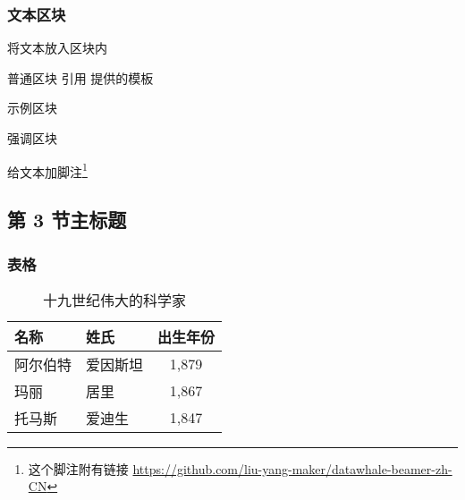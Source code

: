 \documentclass[10pt,utf8]{beamer}
\begin{document}
\begin{frame}[t]
  \frametitle{文本区块}
  将文本放入区块内
  \begin{block}{普通区块}
    引用 \autocite{Y.Liu2021datawhalebeamer} 提供的模板
  \end{block}
  \begin{exampleblock}{示例区块}
  \end{exampleblock}
  \begin{alertblock}{强调区块}
  \end{alertblock}
  给文本加脚注\footnote{这个脚注附有链接 \url{https://github.com/liu-yang-maker/datawhale-beamer-zh-CN}}
\end{frame}


\subsection[第 3 节缩写标题]{第 3 节主标题}

\begin{frame}[t]
  \frametitle{表格}
  \begin{table}
    \begin{tabular}{llc}\toprule
      名称     & 姓氏     & 出生年份  \\ \midrule
      阿尔伯特 & 爱因斯坦 & 1,879     \\
      玛丽     & 居里     & 1,867     \\
      托马斯   & 爱迪生   & 1,847     \\ \bottomrule
    \end{tabular}
    \caption{十九世纪伟大的科学家}
  \end{table}
\end{frame}
\end{document}
